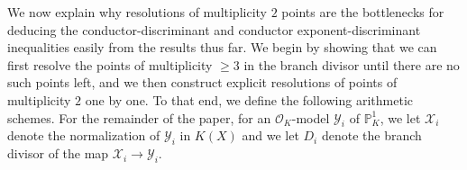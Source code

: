 \documentclass[12pt]{amsart}
\numberwithin{equation}{section}
\theoremstyle{definition}
\newcommand{\padma}[1]{{\color{Magenta} \sf $\clubsuit\clubsuit\clubsuit$ Padma: [#1]}}
\newcommand{\mc}[1]{\mathcal{#1}}
\renewcommand{\O}{\mathcal{O}}
\renewcommand{\P}{\mathbb P}
\newcommand{\X}{\mathcal{X}}
\newcommand{\Y}{\mathcal{Y}}
\begin{document}
 We now explain why resolutions of multiplicity $2$ points are the bottlenecks for deducing the
 conductor-discriminant and conductor exponent-discriminant
 inequalities easily from the results thus far.  We begin by showing that we can first resolve the
 points of multiplicity $\geq 3$ in the branch divisor until there are no such points left, and we then
 construct explicit resolutions of points of multiplicity $2$ one by
 one. To that end, we define the following arithmetic schemes. For the
 remainder of the paper, for an $\mc{O}_K$-model $\Y_i$ of $\P^1_K$,
 we let $\X_i$ denote the normalization of $\Y_i$ in $K(X)$ and we let
 $D_i$ denote the branch divisor of the map $\X_i
 \rightarrow \Y_i$.
 
    
    
    
\end{document}

